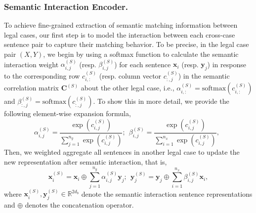 \subsubsection{Semantic Interaction Encoder.} \label{subsubsec: sentence interaction}
To achieve fine-grained extraction of semantic matching information between legal cases, our first step is to model the interaction between each cross-case sentence pair to capture their matching behavior.
To be precise, in the legal case pair $(X, Y)$, we begin by using a softmax function to calculate the semantic interaction weight $\alpha_{i,j}^{(S)}$  (resp. $\beta_{i,j}^{(S)}$) for each sentence $\textbf{x}_i$ (resp. $\textbf{y}_j$) in response to the corresponding row $c_{i, :}^{(S)} $ (resp. column vector $c_{:, j}^{(S)}$) in the semantic correlation matrix $\mathbf{C}^{(S)}$ about the other legal case, i.e., 
$\alpha_{i,:}^{(S)} = \text{softmax}\left(c_{i, :}^{(S)}\right)$ and $\beta_{:,j}^{(S)} = \text{softmax}\left(c_{:, j}^{(S)}\right)$.
To show this in more detail, we provide the following element-wise expansion formula,
\begin{equation} \label{eq: Semantic Interaction Attention}
\alpha_{i,j}^{(S)} = \frac{\exp(c_{i,j}^{(S)})}
{\sum_{j=1}^{n_y} \exp(c_{i, j}^{(S)})}; \ \ 
\beta_{i,j}^{(S)} = \frac{\exp(c_{i,j}^{(S)})}
{\sum_{i=1}^{n_x} \exp(c_{i, j}^{(S)})}, \ \ 
\end{equation}
Then, we weighted aggregate all sentences in another legal case to update the new representation after semantic interaction, that is,
\[
\mathbf{x}_i^{(S)} = \mathbf{x}_i \oplus \sum_{j=1}^{n_y}\alpha_{i, j}^{(S)}\mathbf{y}_j;
\ \ 
\mathbf{y}_j^{(S)} = \mathbf{y}_j \oplus \sum_{i=1}^{n_x}\beta_{i, j}^{(S)}\mathbf{x}_i,
\]
where $\mathbf{x}_i^{(S)}, \mathbf{y}_j^{(S)} \in \mathbb{R}^{2d_b}$ denote the semantic interaction sentence representations and $\oplus$ denotes the concatenation operator.

